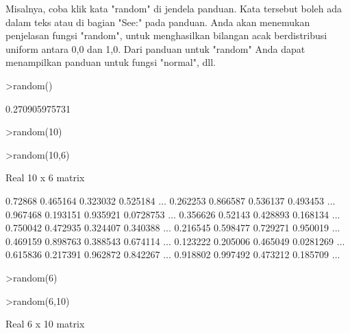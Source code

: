 \documentclass{article}
\newenvironment{eulernotebook}{\par}{\par}
\newenvironment{eulercomment}{\par\medskip}{\par\medskip}
\begin{document}
\begin{eulernotebook}
\begin{eulercomment}
Misalnya, coba klik kata "random" di jendela panduan. Kata tersebut
boleh ada dalam teks atau di bagian "See:" pada panduan. Anda akan
menemukan penjelasan fungsi "random", untuk menghasilkan bilangan acak
berdistribusi uniform antara 0,0 dan 1,0. Dari panduan untuk "random"
Anda dapat menampilkan panduan untuk fungsi "normal", dll.
\end{eulercomment}
\begin{eulerprompt}
>random()
\end{eulerprompt}
\begin{euleroutput}
  0.270905975731
\end{euleroutput}
\begin{eulerprompt}
>random(10)
\end{eulerprompt}
\begin{euleroutput}
  [0.704419,  0.217693,  0.445363,  0.308411,  0.914541,  0.193585,
  0.463387,  0.095153,  0.595017,  0.431184]
\end{euleroutput}
\begin{eulerprompt}
>random(10,6)
\end{eulerprompt}
\begin{euleroutput}
  Real 10 x 6 matrix
  
        0.72868      0.465164      0.323032      0.525184     ...
       0.262253      0.866587      0.536137      0.493453     ...
       0.967468      0.193151      0.935921     0.0728753     ...
       0.356626       0.52143      0.428893      0.168134     ...
       0.750042      0.472935      0.324407      0.340388     ...
       0.216545      0.598477      0.729271      0.950019     ...
       0.469159      0.898763      0.388543      0.674114     ...
       0.123222      0.205006      0.465049     0.0281269     ...
       0.615836      0.217391      0.962872      0.842267     ...
       0.918802      0.997492      0.473212      0.185709     ...
\end{euleroutput}
\begin{eulerprompt}
>random(6)
\end{eulerprompt}
\begin{euleroutput}
  [0.247804,  0.834083,  0.44372,  0.371866,  0.775718,  0.37468]
\end{euleroutput}
\begin{eulerprompt}
>random(6,10)
\end{eulerprompt}
\begin{euleroutput}
  Real 6 x 10 matrix
  

\end{euleroutput}
\end{eulernotebook}
\end{document}
